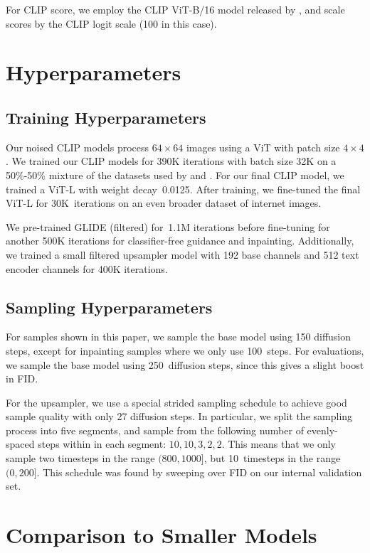 \documentclass{article}
\newcommand{\modelname}{GLIDE}
\begin{document}
For CLIP score, we employ the CLIP ViT-B/16 model released by \citet{clip}, and scale scores by the CLIP logit scale (100 in this case).

\section{Hyperparameters}

\subsection{Training Hyperparameters}

Our noised CLIP models process $64 \times 64$ images using a ViT \citep{vit} with patch size $4 \times 4$. We trained our CLIP models for 390K iterations with batch size 32K on a 50\%-50\% mixture of the datasets used by \citet{clip} and \citet{dalle}. For our final CLIP model, we trained a ViT-L with weight decay~0.0125. After training, we fine-tuned the final ViT-L for 30K~iterations on an even broader dataset of internet images.

We pre-trained \modelname{} (filtered) for~1.1M iterations before fine-tuning for another 500K iterations for classifier-free guidance and inpainting. Additionally, we trained a small filtered upsampler model with 192 base channels and 512 text encoder channels for 400K iterations.

\subsection{Sampling Hyperparameters}

For samples shown in this paper, we sample the base model using 150 diffusion steps, except for inpainting samples where we only use 100~steps. For evaluations, we sample the base model using 250~diffusion steps, since this gives a slight boost in FID.

For the upsampler, we use a special strided sampling schedule to achieve good sample quality with only 27 diffusion steps. In particular, we split the sampling process into five segments, and sample from the following number of evenly-spaced steps within in each segment: $10,10,3,2,2$. This means that we only sample two timesteps in the range $(800, 1000]$, but 10~timesteps in the range $(0,200]$. This schedule was found by sweeping over FID on our internal validation set.

\section{Comparison to Smaller Models}
\label{app:comp_small}
\end{document}

